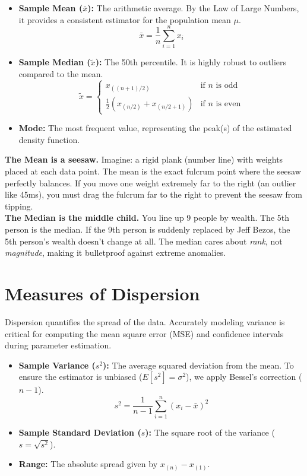\documentclass[11pt, a4paper]{article}
\begin{document}
\begin{itemize}
    \item \textbf{Sample Mean ($\bar{x}$):} The arithmetic average. By the Law of Large Numbers, it provides a consistent estimator for the population mean $\mu$. 
    \[ \bar{x} = \frac{1}{n} \sum_{i=1}^{n} x_i \]
    
    \item \textbf{Sample Median ($\tilde{x}$):} The 50th percentile. It is highly robust to outliers compared to the mean.
    \[ 
    \tilde{x} = 
    \begin{cases} 
    x_{((n+1)/2)} & \text{if } n \text{ is odd} \\
    \frac{1}{2} \left( x_{(n/2)} + x_{(n/2 + 1)} \right) & \text{if } n \text{ is even} 
    \end{cases} 
    \]
    
    \item \textbf{Mode:} The most frequent value, representing the peak(s) of the estimated density function.
\end{itemize}

\begin{tcolorbox}[profbox, title=Imagine: The Seesaw vs. The Middle Child]
\textbf{The Mean is a seesaw.} Imagine: a rigid plank (number line) with weights placed at each data point. The mean is the exact fulcrum point where the seesaw perfectly balances. If you move one weight extremely far to the right (an outlier like 45ms), you must drag the fulcrum far to the right to prevent the seesaw from tipping. \\
\textbf{The Median is the middle child.} You line up 9 people by wealth. The 5th person is the median. If the 9th person is suddenly replaced by Jeff Bezos, the 5th person's wealth doesn't change at all. The median cares about \textit{rank}, not \textit{magnitude}, making it bulletproof against extreme anomalies.
\end{tcolorbox}

\section{Measures of Dispersion}
Dispersion quantifies the spread of the data. Accurately modeling variance is critical for computing the mean square error (MSE) and confidence intervals during parameter estimation.

\begin{itemize}
    \item \textbf{Sample Variance ($s^2$):} The average squared deviation from the mean. To ensure the estimator is unbiased ($E[s^2] = \sigma^2$), we apply Bessel's correction ($n-1$).
    \[ s^2 = \frac{1}{n-1} \sum_{i=1}^{n} (x_i - \bar{x})^2 \]
    
    \item \textbf{Sample Standard Deviation ($s$):} The square root of the variance ($s = \sqrt{s^2}$).
    
    \item \textbf{Range:} The absolute spread given by $x_{(n)} - x_{(1)}$.
\end{itemize}
\end{document}
